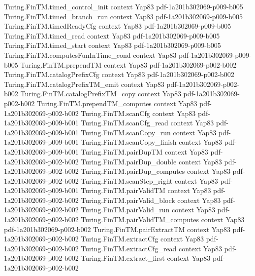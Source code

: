\begin{theorem}
\proofstep
  {Turing.FinTM.timed_control_init}
  {context}
  {Yap83}
  {pdf-1a201b302069-p009-b005}
\proofstep
  {Turing.FinTM.timed_branch_run}
  {context}
  {Yap83}
  {pdf-1a201b302069-p009-b005}
\proofstep
  {Turing.FinTM.timedReadyCfg}
  {context}
  {Yap83}
  {pdf-1a201b302069-p009-b005}
\proofstep
  {Turing.FinTM.timed_read}
  {context}
  {Yap83}
  {pdf-1a201b302069-p009-b005}
\proofstep
  {Turing.FinTM.timed_start}
  {context}
  {Yap83}
  {pdf-1a201b302069-p009-b005}
\proofstep
  {Turing.FinTM.computesFunInTime_cond}
  {context}
  {Yap83}
  {pdf-1a201b302069-p009-b005}
\proofstep
  {Turing.FinTM.prependTM}
  {context}
  {Yap83}
  {pdf-1a201b302069-p002-b002}
\proofstep
  {Turing.FinTM.catalogPrefixCfg}
  {context}
  {Yap83}
  {pdf-1a201b302069-p002-b002}
\proofstep
  {Turing.FinTM.catalogPrefixTM_emit}
  {context}
  {Yap83}
  {pdf-1a201b302069-p002-b002}
\proofstep
  {Turing.FinTM.catalogPrefixTM_copy}
  {context}
  {Yap83}
  {pdf-1a201b302069-p002-b002}
\proofstep
  {Turing.FinTM.prependTM_computes}
  {context}
  {Yap83}
  {pdf-1a201b302069-p002-b002}
\proofstep
  {Turing.FinTM.scanCfg}
  {context}
  {Yap83}
  {pdf-1a201b302069-p009-b001}
\proofstep
  {Turing.FinTM.scanCfg_read}
  {context}
  {Yap83}
  {pdf-1a201b302069-p009-b001}
\proofstep
  {Turing.FinTM.scanCopy_run}
  {context}
  {Yap83}
  {pdf-1a201b302069-p009-b001}
\proofstep
  {Turing.FinTM.scanCopy_finish}
  {context}
  {Yap83}
  {pdf-1a201b302069-p009-b001}
\proofstep
  {Turing.FinTM.pairDupTM}
  {context}
  {Yap83}
  {pdf-1a201b302069-p002-b002}
\proofstep
  {Turing.FinTM.pairDup_double}
  {context}
  {Yap83}
  {pdf-1a201b302069-p002-b002}
\proofstep
  {Turing.FinTM.pairDup_computes}
  {context}
  {Yap83}
  {pdf-1a201b302069-p002-b002}
\proofstep
  {Turing.FinTM.scanStep_right}
  {context}
  {Yap83}
  {pdf-1a201b302069-p009-b001}
\proofstep
  {Turing.FinTM.pairValidTM}
  {context}
  {Yap83}
  {pdf-1a201b302069-p002-b002}
\proofstep
  {Turing.FinTM.pairValid_block}
  {context}
  {Yap83}
  {pdf-1a201b302069-p002-b002}
\proofstep
  {Turing.FinTM.pairValid_run}
  {context}
  {Yap83}
  {pdf-1a201b302069-p002-b002}
\proofstep
  {Turing.FinTM.pairValidTM_computes}
  {context}
  {Yap83}
  {pdf-1a201b302069-p002-b002}
\proofstep
  {Turing.FinTM.pairExtractTM}
  {context}
  {Yap83}
  {pdf-1a201b302069-p002-b002}
\proofstep
  {Turing.FinTM.extractCfg}
  {context}
  {Yap83}
  {pdf-1a201b302069-p002-b002}
\proofstep
  {Turing.FinTM.extractCfg_read}
  {context}
  {Yap83}
  {pdf-1a201b302069-p002-b002}
\proofstep
  {Turing.FinTM.extract_first}
  {context}
  {Yap83}
  {pdf-1a201b302069-p002-b002}
\proofstep

\end{theorem}
